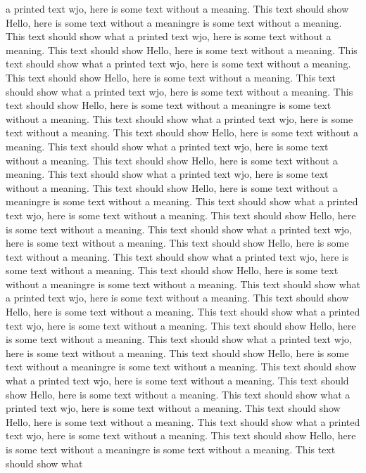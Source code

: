 \documentclass{article}
\begin{document}
\begin{multicols}{3}
a printed text wjo, here is some text without a meaning.  This text should show 
Hello, here is some text without a meaningre is some text without a meaning.  This text should show what 
a printed text wjo, here is some text without a meaning.  This text should show 
Hello, here is some text without a meaning.  This text should show what 
a printed text wjo, here is some text without a meaning.  This text should show 
Hello, here is some text without a meaning.  This text should show what 
a printed text wjo, here is some text without a meaning.  This text should show 
Hello, here is some text without a meaningre is some text without a meaning.  This text should show what 
a printed text wjo, here is some text without a meaning.  This text should show 
Hello, here is some text without a meaning.  This text should show what 
a printed text wjo, here is some text without a meaning.  This text should show 
Hello, here is some text without a meaning.  This text should show what 
a printed text wjo, here is some text without a meaning.  This text should show 
Hello, here is some text without a meaningre is some text without a meaning.  This text should show what 
a printed text wjo, here is some text without a meaning.  This text should show 
Hello, here is some text without a meaning.  This text should show what 
a printed text wjo, here is some text without a meaning.  This text should show 
Hello, here is some text without a meaning.  This text should show what 
a printed text wjo, here is some text without a meaning.  This text should show 
Hello, here is some text without a meaningre is some text without a meaning.  This text should show what 
a printed text wjo, here is some text without a meaning.  This text should show 
Hello, here is some text without a meaning.  This text should show what 
a printed text wjo, here is some text without a meaning.  This text should show 
Hello, here is some text without a meaning.  This text should show what 
a printed text wjo, here is some text without a meaning.  This text should show 
Hello, here is some text without a meaningre is some text without a meaning.  This text should show what 
a printed text wjo, here is some text without a meaning.  This text should show 
Hello, here is some text without a meaning.  This text should show what 
a printed text wjo, here is some text without a meaning.  This text should show 
Hello, here is some text without a meaning.  This text should show what 
a printed text wjo, here is some text without a meaning.  This text should show 
Hello, here is some text without a meaningre is some text without a meaning.  This text should show what 

\end{multicols}
\end{document}
